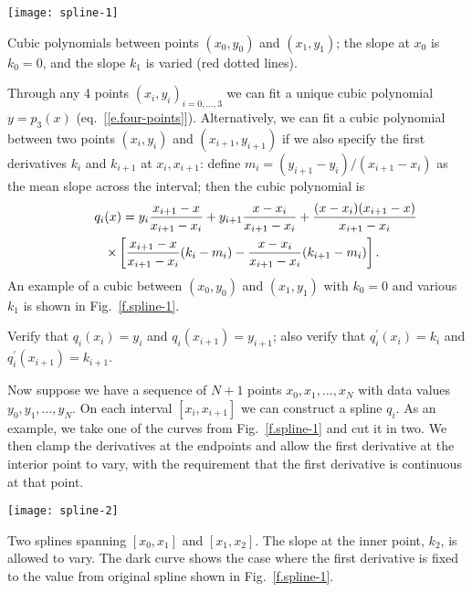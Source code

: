 \begin{marginfigure}
\texttt{[image: spline-1]}
\caption{\label{f.spline-1}Cubic polynomials between points $(x_{0},y_{0})$ and $(x_{1},y_{1})$; the slope at $x_{0}$ is $k_{0}=0$, and the slope $k_{1}$ is varied (red dotted lines).}
\end{marginfigure}
Through any 4 points $(x_{i},y_{i})_{i=0,\ldots,3}$ we can fit a unique cubic polynomial $y=p_{3}(x)$ (eq.~[\ref{e.four-points}]).  Alternatively, we can fit a cubic polynomial between two points $(x_{i},y_{i})$ and $(x_{i+1},y_{i+1})$ if we also specify the first derivatives $k_{i}$ and $k_{i+1}$ at $x_{i},x_{i+1}$: define $m_{i} = (y_{i+1}-y_{i})/(x_{i+1}-x_{i})$ as the mean slope across the interval; then the cubic polynomial is
\begin{eqnarray}
\lefteqn{q_{i}(x) =   y_{i}\frac{x_{i+1}-x}{x_{i+1}-x_{i}} 
		   + y_{i+1}\frac{x-x_{i}}{x_{i+1}-x_{i}}
		   + \frac{(x-x_{i})(x_{i+1}-x)}{x_{i+1}-x_{i}}} && \nonumber\\
		   && \times\left[\frac{x_{i+1}-x}{x_{i+1}-x_{i}}(k_{i}-m_{i})
		       -\frac{x-x_{i}}{x_{i+1}-x_{i}}(k_{i+1}-m_{i})\right].
\label{e.spline}
\end{eqnarray}
An example of a cubic between $(x_{0},y_{0})$ and $(x_{1},y_{1})$ with $k_{0}=0$ and various $k_{1}$ is shown in Fig.~\ref{f.spline-1}.

\begin{exercisebox}
Verify that $q_{i}(x_{i}) = y_{i}$ and $q_{i}(x_{i+1}) = y_{i+1}$; also verify that $q^{\prime}_{i}(x_{i}) = k_{i}$ and $q^{\prime}_{i}(x_{i+1}) = k_{i+1}$.
\end{exercisebox}

Now suppose we have a sequence of $N+1$ points $x_{0},x_{1},\ldots,x_{N}$ with data values $y_{0},y_{1},\ldots,y_{N}$. On each interval $[x_{i},x_{i+1}]$ we can construct a spline $q_{i}$. As an example, we take one of the curves from Fig.~\ref{f.spline-1} and cut it in two. We then clamp the derivatives at the endpoints and allow the first derivative at the interior point to vary, with the requirement that the first derivative is continuous at that point. 
\begin{marginfigure}
\texttt{[image: spline-2]}
\caption[Two splines connected at an interior point]{\label{f.spline-2} Two splines spanning $[x_{0},x_{1}]$ and $[x_{1},x_{2}]$. The slope at the inner point, $k_{2}$, is allowed to vary. The dark curve shows the case where the first derivative is fixed to the value from original spline shown in Fig.~\ref{f.spline-1}.}
\end{marginfigure}

